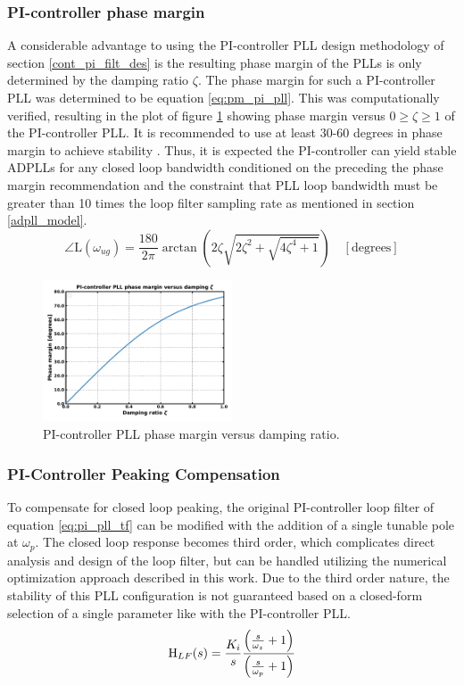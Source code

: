 		\subsubsection{PI-controller phase margin}\label{pi_phase_margin}
			A considerable advantage to using the PI-controller PLL design methodology of section \ref{cont_pi_filt_des} is the resulting phase margin of the PLLs is only determined by the damping ratio $\zeta$. The phase margin for such a PI-controller PLL was determined to be equation \ref{eq:pm_pi_pll}. This was computationally verified, resulting in the plot of figure \ref{fig:phase_margin} showing phase margin versus $0 \geq \zeta \geq 1$ of the PI-controller PLL. It is recommended to use at least 30-60 degrees in phase margin to achieve stability \cite{ogata_2010_stability}. Thus, it is expected the  PI-controller can yield stable ADPLLs for any closed loop bandwidth conditioned on the preceding the phase margin recommendation and the constraint that PLL loop bandwidth must be greater than 10 times the loop filter sampling rate as mentioned in section \ref{adpll_model}.
			\begin{equation}\label{eq:pm_pi_pll}
				\angle \text{L}(\omega_{ug}) = \frac{180}{2\pi}\arctan\left(2\zeta\sqrt{2\zeta^2 + \sqrt{4\zeta^4+1}}\right)\hspace{1em}[\text{degrees}]
			\end{equation}
			\begin{figure}[htb!]
				\center\includegraphics[width=0.5\textwidth, angle=0]{figs/damping_vs_pm.pdf}
				\caption{PI-controller PLL phase margin versus damping ratio.}
				\label{fig:phase_margin}
			\end{figure}

		\subsubsection{PI-Controller Peaking Compensation}\label{comp_pi_pll_lf}
			 To compensate for closed loop peaking, the original PI-controller loop filter of equation \ref{eq:pi_pll_tf} can be modified with the addition of a single tunable pole at $\omega_p$. The closed loop response becomes third order, which complicates direct analysis and design of the loop filter, but can be handled utilizing the numerical optimization approach described in this work. Due to the third order nature, the stability of this PLL configuration is not guaranteed based on a closed-form selection of a single parameter like with the PI-controller PLL. 
			\begin{equation} \label{eq:pi_compensated_tf}
				\textnormal{H}_{LF}(s) = \frac{K_i}{s}\frac{\left(\frac{s}{\omega_z} + 1\right)}{\left(\frac{s}{\omega_p} + 1\right)}
			\end{equation}


